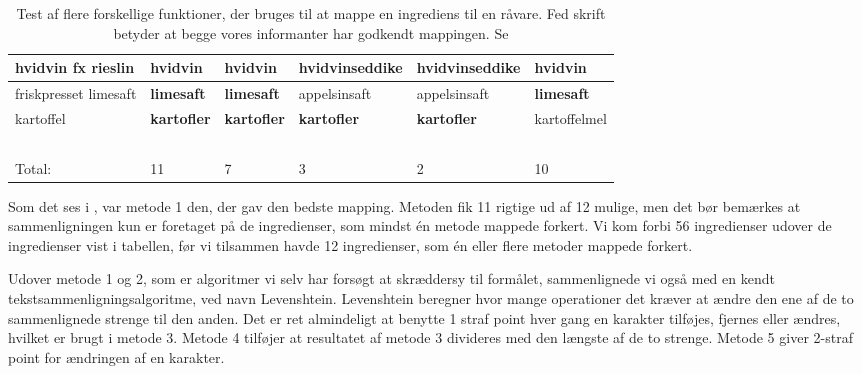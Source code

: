 \begin{table}
\begin{tabular}{|p{2cm}|p{2cm}|p{2cm}|p{2cm}|p{2cm}|p{2cm}|}
        hvidvin fx rieslin                                         & \textbf{hvidvin}         & \textbf{hvidvin}                 & hvidvinseddike     & hvidvinseddike     & \textbf{hvidvin}         \\ \hline
        friskpresset limesaft                                      & \textbf{limesaft}        & \textbf{limesaft}                & appelsinsaft       & appelsinsaft       & \textbf{limesaft}        \\ \hline
        kartoffel                                                  & \textbf{kartofler}       & \textbf{kartofler}               & \textbf{kartofler}          & \textbf{kartofler}          & kartoffelmel    \\ \hline
        ~                                                          & ~               & ~                       & ~                  & ~                  & ~               \\ \hline
        Total:                                                     & 11              & 7                       & 3                  & 2                  & 10              \\
        \hline
    \end{tabular}
  \caption{Test af flere forskellige  funktioner, der bruges til at mappe en ingrediens til en råvare. Fed skrift betyder at begge vores informanter har godkendt mappingen. Se }  \label{table:test-af-compares}
\end{table}

Som det ses i , var metode 1 den, der gav den bedste mapping. Metoden fik 11 rigtige ud af 12 mulige, men det bør bemærkes at sammenligningen kun er foretaget på de ingredienser, som mindst én metode mappede forkert. Vi kom forbi 56 ingredienser udover de ingredienser vist i tabellen, før vi tilsammen havde 12 ingredienser, som én eller flere metoder mappede forkert. 

Udover metode 1 og 2, som er algoritmer vi selv har forsøgt at skræddersy til formålet, sammenlignede vi også med en kendt tekstsammenligningsalgoritme, ved navn Levenshtein. Levenshtein beregner hvor mange operationer det kræver at ændre den ene af de to sammenlignede strenge til den anden\cite{levenshtein}. Det er ret almindeligt at benytte 1 straf point hver gang en karakter tilføjes, fjernes eller ændres, hvilket er brugt i metode 3.  Metode 4 tilføjer at resultatet af metode 3 divideres med den længste af de to strenge. Metode 5 giver 2-straf point for ændringen af en karakter.
 
